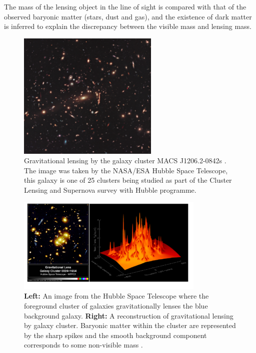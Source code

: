 The mass of the lensing object in the line of sight is compared with that of the observed baryonic matter (stars, dust and gas), and the existence of dark matter is inferred to explain the discrepancy between the visible mass and lensing mass. 
\begin{figure}[ht!]
	\centering
	\includegraphics[width=0.6\textwidth]{figures/DMOverview/GravLensIm.jpg}
	\caption[Gravitational lensing by the galaxy cluster MACS J1206.2-0842s.]{Gravitational lensing by the galaxy cluster MACS J1206.2-0842s \cite{GravLensPicture}. The image was taken by the NASA/ESA Hubble Space Telescope, this galaxy is one of 25 clusters being studied as part of the Cluster Lensing and Supernova survey with Hubble programme.}
	\label{fig:DMOverview/GravLens}
\end{figure}
\begin{figure}[ht!]
	\centering
	\includegraphics[width=0.8\textwidth]{figures/DMOverview/Strong_Grav_lens.png}
	\caption[\textbf{Left:} Effects of gravitational lensing on multiple galaxies. \textbf{Right:} Reconstruction of gravitational lensing effects.]{\textbf{Left:} An image from the Hubble Space Telescope where the foreground cluster of galaxies gravitationally lenses the blue background galaxy. \textbf{Right:} A reconstruction of gravitational lensing by galaxy cluster. Baryonic matter within the cluster are represented by the sharp spikes and the smooth background component corresponds to some non-visible mass \cite{Freese2009}.}
	\label{fig:DMOverview/StrongGravLens}
\end{figure}
